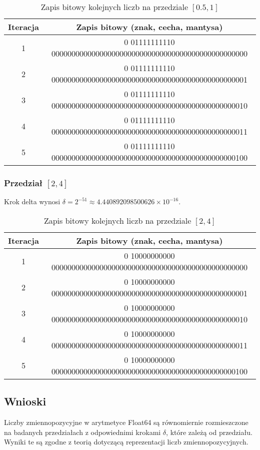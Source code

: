 \documentclass{article}
\begin{document}
\begin{table}[h!]
\centering
\renewcommand{\arraystretch}{1.2}
\begin{tabular}{|c|c|}
\hline
Iteracja & Zapis bitowy (znak, cecha, mantysa) \\
\hline
1 & 0 01111111110 0000000000000000000000000000000000000000000000000 \\
2 & 0 01111111110 0000000000000000000000000000000000000000000000001 \\
3 & 0 01111111110 0000000000000000000000000000000000000000000000010 \\
4 & 0 01111111110 0000000000000000000000000000000000000000000000011 \\
5 & 0 01111111110 0000000000000000000000000000000000000000000000100 \\
\hline
\end{tabular}
\caption{Zapis bitowy kolejnych liczb na przedziale $[0.5,1]$}
\end{table}

\subsubsection{Przedział $[2,4]$}
Krok delta wynosi $\delta = 2^{-51} \approx 4.440892098500626 \times 10^{-16}$.

\begin{table}[h!]
\centering
\renewcommand{\arraystretch}{1.2}
\begin{tabular}{|c|c|}
\hline
Iteracja & Zapis bitowy (znak, cecha, mantysa) \\
\hline
1 & 0 10000000000 0000000000000000000000000000000000000000000000000 \\
2 & 0 10000000000 0000000000000000000000000000000000000000000000001 \\
3 & 0 10000000000 0000000000000000000000000000000000000000000000010 \\
4 & 0 10000000000 0000000000000000000000000000000000000000000000011 \\
5 & 0 10000000000 0000000000000000000000000000000000000000000000100 \\
\hline
\end{tabular}
\caption{Zapis bitowy kolejnych liczb na przedziale $[2,4]$}
\end{table}

\subsection{Wnioski}
Liczby zmiennopozycyjne w arytmetyce Float64 są równomiernie rozmieszczone na badanych przedziałach z odpowiednimi krokami $\delta$, które zależą od przedziału. Wyniki te są zgodne z teorią dotyczącą reprezentacji liczb zmiennopozycyjnych.
\end{document}
